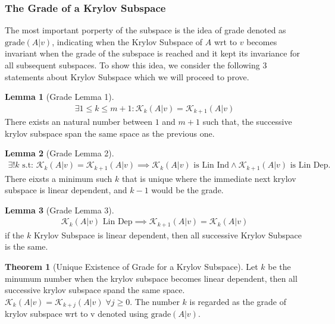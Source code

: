 \documentclass[]{article}
\theoremstyle{definition}
\newtheorem{theorem}{Theorem}  %
\newtheorem{lemma}{Lemma}[subsection]  %
\begin{document}
        \subsubsection{The Grade of a Krylov Subspace}
            The most important porperty of the subspace is the idea of grade denoted as $\text{grade}(A|v)$, indicating when the Krylov Subspace of $A$ wrt to $v$ becomes invariant when the grade of the subspace is reached and it kept its invariance for all subsequent subspaces. To show this idea, we consider the following 3 statements about Krylov Subspace which we will proceed to prove. 
            \begin{lemma}[Grade Lemma 1]
                \begin{align}
                    \exists 1 \le k \le m + 1: \mathcal K_k(A|v) = \mathcal K_{k + 1}(A|v)
                \end{align}
                There exists an natural number between $1$ and $m+ 1$ such that, the successive krylov subspace span the same space as the previous one. 
            \end{lemma} 
            \begin{lemma}[Grade Lemma 2]
                \begin{align}
                    \exists! k \text{ s.t: }\mathcal K_k(A|v) = \mathcal K_{k + 1}(A|v) \implies 
                    \mathcal K_k(A|v) \text{ is Lin Ind} \wedge \mathcal K_{k + 1}(A|v) \text{ is Lin Dep}. 
                \end{align}
                There eixsts a minimum such $k$ that is unique where the immediate next krylov subspace is linear dependent, and $k - 1$ would be the grade. 
            \end{lemma}
            \begin{lemma}[Grade Lemma 3]
                \begin{align}
                    \mathcal K_k(A|v) \text{ Lin Dep} \implies \mathcal K_{k + 1}(A|v) = \mathcal K_k(A|v)
                \end{align}
                if the $k$ Krylov Subspace is linear dependent, then all successive Krylov Subspace is the same. 
            \end{lemma}
            \begin{theorem}[Unique Existence of Grade for a Krylov Subspace]
                \label{theorem:Existence_of_Grade_for_a_Krylov_Subspace}
                Let $k$ be the minumum number when the krylov subspace becomes linear dependent, then all successive krylov subspace spand the same space. $\mathcal K_k(A|v) = \mathcal K_{k + j}(A|v) \;\forall j \ge 0$. The number $k$ is regarded as the grade of krylov subspace wrt to v denoted using $\text{grade}(A|v)$. 
            \end{theorem}
\end{document}
